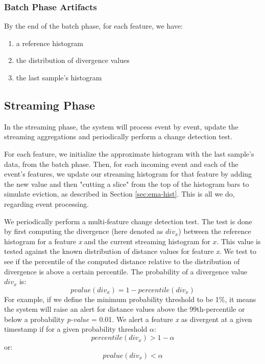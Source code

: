 \documentclass[sigconf]{acmart}
\begin{document}
\subsubsection{Batch Phase Artifacts} \label{sec:batch-artifacts-summary}
By the end of the batch phase, for each feature, we have: 
\begin{enumerate}
    \item a reference histogram
    \item the distribution of divergence values
    \item the last sample's histogram
\end{enumerate}


\subsection{Streaming Phase} \label{sec:stream-phase}
In the streaming phase, the system will process event by event, update the streaming aggregations and periodically perform a change detection test. 

For each feature, we initialize the approximate histogram with the last sample's data, from the batch phase. Then, for each incoming event and each of the event's features, we update our streaming histogram for that feature by adding the new value and then "cutting a slice" from the top of the histogram bars to simulate eviction, as described in Section \ref{sec:ema-hist}. This is all we do, regarding event processing.

We periodically perform a multi-feature change detection test. The test is done by first computing the divergence (here denoted as $div_x$) between the reference histogram for a feature \textit{x} and the current streaming histogram for $x$. This value is tested against the known distribution of distance values for feature \textit{x}. We test to see if the percentile of the computed distance relative to the distribution of divergence is above a certain percentile. The probability of a divergence value $div_x$ is:
\[pvalue(div_x) = 1 - percentile(div_x)\]
For example, if we define the minimum probability threshold to be 1\%, it means the system will raise an alert for distance values above the 99th-percentile or below a probability \textit{p-value} = 0.01. We alert a feature \textit{x} as divergent at a given timestamp if for a given probability threshold $\alpha$:
\[ percentile(div_x) > 1 - \alpha \]
or:
\begin{equation}
    \label{eq:alert-test}
    pvalue(div_x) < \alpha
\end{equation}
\end{document}
